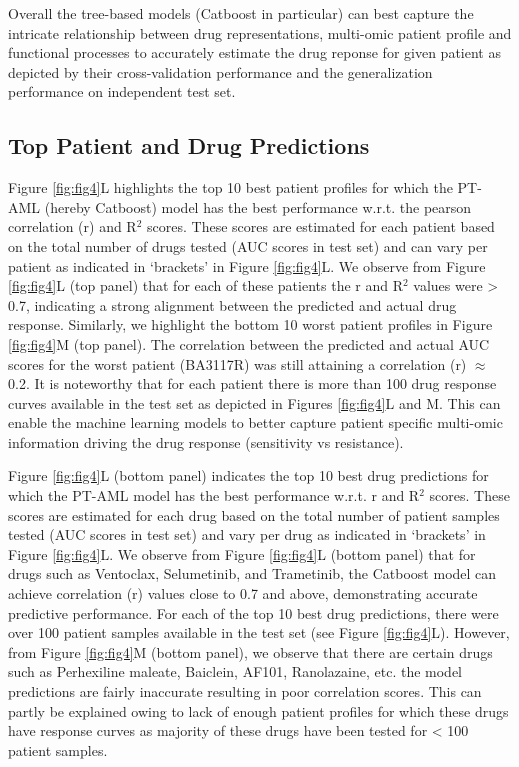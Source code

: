 \documentclass[runningheads,10pt]{llncs}
\begin{document}
Overall the tree-based models (Catboost in particular) can best capture the intricate relationship between drug representations, multi-omic patient profile and functional processes to accurately estimate the drug reponse for given patient as depicted by their cross-validation performance and the generalization performance on independent test set.
\subsection{Top Patient and Drug Predictions}
Figure \ref{fig:fig4}L highlights the top 10 best patient profiles for which the PT-AML (hereby Catboost) model has the best performance w.r.t. the pearson correlation (r) and R$^2$ scores. These scores are estimated for each patient based on the total number of drugs tested (AUC scores in test set) and can vary per patient as indicated in `brackets' in Figure \ref{fig:fig4}L. We observe from Figure \ref{fig:fig4}L (top panel) that for each of these patients the r and R$^2$ values were > 0.7, indicating a strong alignment between the predicted and actual drug response. Similarly, we highlight the bottom 10 worst patient profiles in Figure \ref{fig:fig4}M (top panel). The correlation between the predicted and actual AUC scores for the worst patient (BA3117R) was still attaining a correlation (r) $\approx$ 0.2. It is noteworthy that for each patient there is more than 100 drug response curves available in the test set as depicted in Figures \ref{fig:fig4}L and M. This can enable the machine learning models to better capture patient specific multi-omic information driving the drug response (sensitivity vs resistance).

Figure \ref{fig:fig4}L (bottom panel) indicates the top 10 best drug predictions for which the PT-AML model has the best performance w.r.t. r and R$^2$ scores. These scores are estimated for each drug based on the total number of patient samples tested (AUC scores in test set) and vary per drug as indicated in `brackets' in Figure \ref{fig:fig4}L. We observe from Figure \ref{fig:fig4}L (bottom panel) that for drugs such as Ventoclax, Selumetinib, and Trametinib, the Catboost model can achieve correlation (r) values close to 0.7 and above, demonstrating accurate predictive performance. For each of the top 10 best drug predictions, there were over 100 patient samples available in the test set (see Figure \ref{fig:fig4}L). However, from Figure \ref{fig:fig4}M (bottom panel), we observe that there are certain drugs such as Perhexiline maleate, Baiclein, AF101, Ranolazaine, etc. the model predictions are fairly inaccurate resulting in poor correlation scores. This can partly be explained owing to lack of enough patient profiles for which these drugs have response curves as majority of these drugs have been tested for < 100 patient samples. 
\end{document}
